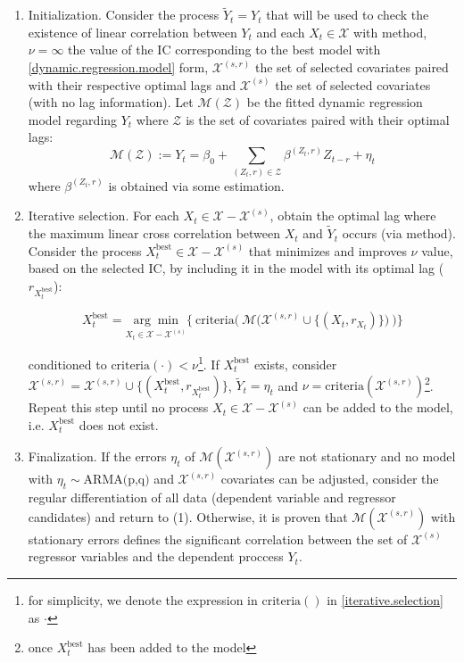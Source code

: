 \documentclass[a4paper]{easychair}
\begin{document}
\begin{enumerate}
    \item Initialization. Consider the process $\tilde{Y}_t=Y_t$ that will be used to check the existence of linear correlation between $Y_t$ and each $X_t\in \mathcal{X}$ with \cite{cryer2008time} method, $\nu=\infty$ the value of the IC corresponding to the best model with \ref{dynamic.regression.model} form, $\mathcal{X}^{(s,r)}$ the set of selected covariates paired with their respective optimal lags and $\mathcal{X}^{(s)}$ the set of selected covariates (with no lag information). Let $\mathcal{M}(\mathcal{Z})$ be the fitted dynamic regression model regarding $Y_t$ where $\mathcal{Z}$ is the set of covariates paired with their optimal lags:
    \[ \mathcal{M}(\mathcal{Z}) := Y_t = \beta_0 + \sum_{(Z_t, r)\in\mathcal{Z}} \beta^{(Z_t, r)} Z_{t-r} + \eta_t\]
    \noindent where $\beta^{(Z_t, r)}$ is obtained via some estimation.

    \item Iterative selection. For each $X_t\in\mathcal{X}-\mathcal{X}^{(s)}$, obtain the optimal lag where the maximum linear cross correlation between $X_t$ and $\tilde{Y}_t$ occurs (via \cite{cryer2008time} method). Consider the process $X_t^\text{best}\in\mathcal{X}-\mathcal{X}^{(s)}$ that minimizes and improves $\nu$ value, based on the selected IC, by including it in the model with its optimal lag ($r_{X_t^\text{best}}$):
    
    \begin{equation}\label{iterative.selection}
        X^\text{best}_t =  \underset{X_t\in\mathcal{X}-\mathcal{X}^{(s)}}{\arg\min} \Bigg\{ \ \text{criteria}\Bigg(\ \mathcal{M}\Big(\mathcal{X}^{(s,r)} \cup \big\{(X_t, r_{X_t})\big\} \Big) \ \Bigg) \Bigg\}
    \end{equation}

    \noindent conditioned to $\text{criteria}(\cdot) < \nu$\footnote{for simplicity, we denote the expression in $\text{criteria}()$ in \ref{iterative.selection} as $\cdot$}. 
    If $X^{\text{best}}_t$ exists, consider $\mathcal{X}^{(s,r)} = \mathcal{X}^{(s,r)}  \cup \{(X_t^\text{best}, r_{X_t^\text{best}})\}$, $\tilde{Y}_t = \eta_t$ and $\nu=\text{criteria}(\mathcal{X}^{(s,r)})$\footnote{once $X_t^\text{best}$ has been added to the model }. Repeat this step until no process $X_t\in\mathcal{X}-\mathcal{X}^{(s)}$ can be added to the model, i.e. $X_t^\text{best}$ does not exist.

    \item Finalization. If the errors $\eta_t$ of $\mathcal{M}(\mathcal{X}^{(s,r)})$ are not stationary and no model with $\eta_t\sim\text{ARMA(p,q)}$ and $\mathcal{X}^{(s,r)}$ covariates can be adjusted, consider the regular differentiation of all data (dependent variable and regressor candidates) and return to (1). Otherwise, it is proven that  $\mathcal{M}(\mathcal{X}^{(s,r)})$ with stationary errors defines the significant correlation between the set of $\mathcal{X}^{(s)}$ regressor variables and the dependent proccess $Y_t$.
\end{enumerate}
\end{document}
